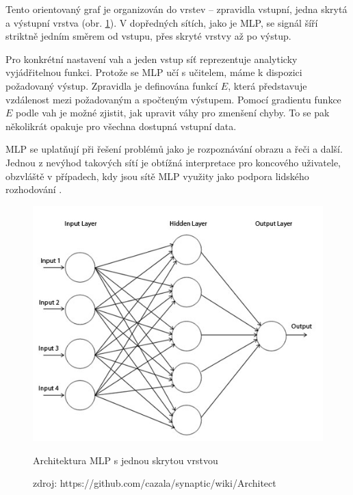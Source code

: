 \documentclass[thesis=M,czech]{FITthesis}[2012/06/26]
\begin{document}
Tento orientovaný graf je organizován do vrstev -- zpravidla vstupní, jedna skrytá a výstupní vrstva (obr. \ref{fig:mlp}). V dopředných sítích, jako je MLP, se signál šíří striktně jedním směrem od vstupu, přes skryté vrstvy až po výstup. 

Pro konkrétní nastavení vah a jeden vstup síť reprezentuje analyticky vyjádřitelnou funkci. Protože se MLP učí s učitelem, máme k dispozici požadovaný výstup. Zpravidla je definována funkcí $E$, která představuje vzdálenost mezi požadovaným a spočteným výstupem. Pomocí gradientu funkce $E$ podle vah je možné zjistit, jak upravit váhy pro zmenšení chyby. To se pak několikrát opakuje pro všechna dostupná vstupní data. 

MLP se uplatňují při řešení problémů jako je rozpoznávání obrazu a řeči a další. Jednou z nevýhod takových sítí je obtížná interpretace pro koncového uživatele, obzvláště v případech, kdy jsou sítě MLP využity jako podpora lidského rozhodování \cite{needed}. 



\begin{figure}[htbp]
\begin{center}
	\includegraphics[scale=0.4]{mlp.jpeg}
\caption{Architektura MLP s jednou skrytou vrstvou}
\label{fig:mlp}
\end{center}
  \caption*{zdroj: https://github.com/cazala/synaptic/wiki/Architect}
\end{figure}
\end{document}
